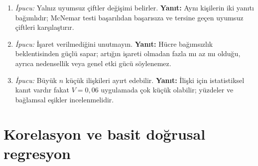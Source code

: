 \begin{enumerate}[leftmargin=*,itemsep=5pt]
\item \emph{İpucu:} Yalnız uyumsuz çiftler değişimi belirler.
\textbf{Yanıt:} Aynı kişilerin iki yanıtı bağımlıdır; McNemar testi başarılıdan
başarısıza ve tersine geçen uyumsuz çiftleri karşılaştırır.
\item \emph{İpucu:} İşaret verilmediğini unutmayın.
\textbf{Yanıt:} Hücre bağımsızlık beklentisinden güçlü sapar; artığın işareti
olmadan fazla mı az mı olduğu, ayrıca nedensellik veya genel etki gücü söylenemez.
\item \emph{İpucu:} Büyük $n$ küçük ilişkileri ayırt edebilir.
\textbf{Yanıt:} İlişki için istatistiksel kanıt vardır fakat $V=0{,}06$
uygulamada çok küçük olabilir; yüzdeler ve bağlamsal eşikler incelenmelidir.
\end{enumerate}

\section{Korelasyon ve basit doğrusal regresyon}

